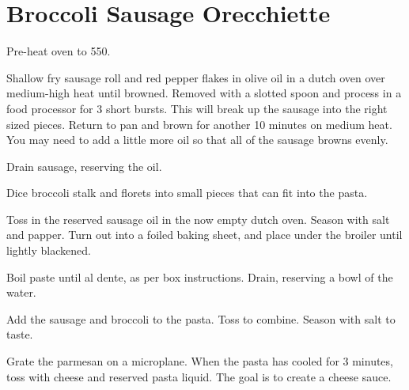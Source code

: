 \section{Broccoli Sausage Orecchiette}
\begin{recipe}



Pre-heat oven to 550\degree{}.

Shallow fry sausage roll and red pepper flakes in olive oil in a dutch oven over medium-high heat until
browned. Removed with a slotted spoon and process in a food processor for 3
short bursts. This will break up the sausage into the right sized pieces.
Return to pan and brown for another 10 minutes on medium heat. You may need to add a
little more oil so that all of the sausage browns evenly. 

Drain sausage, reserving the oil.


Dice broccoli stalk and florets into small pieces that can fit into the pasta. 

Toss in the reserved sausage oil in the now empty dutch oven. Season with salt and papper. 
Turn out into a foiled baking sheet, and place under the broiler until lightly blackened.


Boil paste until al dente, as per box instructions. Drain, reserving a bowl
of the water.

Add the sausage and broccoli to the pasta. Toss to combine.
Season with salt to taste. 


Grate the parmesan on a microplane. When the pasta has cooled for 3
minutes, toss with cheese and reserved pasta liquid. The goal is to create a
cheese sauce.


\end{recipe}

